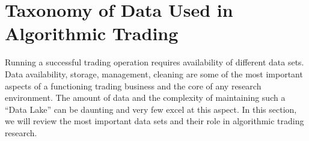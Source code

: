\section{Taxonomy of Data Used in Algorithmic Trading\label{sec:taxonomy_data_algtrad}}

Running a successful trading operation requires availability of different data sets. Data availability, storage, management, cleaning are some of the most important aspects of a functioning trading business and the core of any research environment. The amount of data and the complexity of maintaining such a ``Data Lake'' can be daunting and very few  excel at this aspect. In this section, we will review the most important data sets and their role in algorithmic trading research. \label{in:data_related1} \label{in:taxonomy}

